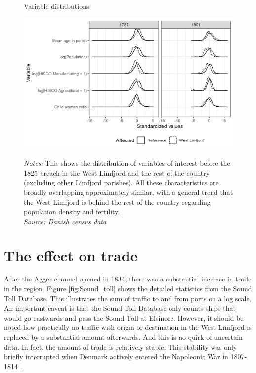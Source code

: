 \documentclass[11pt]{article}
\begin{document}
\begin{figure}
\begin{center}
  \caption{Variable distributions}
  \label{fig:bal}
  \includegraphics[width=1\textwidth]{Plots/Balancing_plot.png}
  \parbox{0.9\textwidth}{
  \caption*{\footnotesize \textit{Notes:} This shows the distribution of variables of interest before the 1825 breach in the West Limfjord and the rest of the country (excluding other Limfjord parishes). All these characteristics are broadly overlapping approximately similar, with a general trend that the West Limfjord is behind the rest of the country regarding population density and fertility. \\ \textit{Source: Danish census data}}
}
\end{center}
\end{figure}

\FloatBarrier
\section{The effect on trade}
After the Agger channel opened in 1834, there was a substantial increase in trade in the region. Figure \ref{fig:Sound_toll} shows the detailed statistics from the Sound Toll Database. This illustrates the sum of traffic to and from ports on a log scale. An important caveat is that the Sound Toll Database only counts ships that would go eastwards and pass the Sound Toll at Elsinore. However, it should be noted how practically no traffic with origin or destination in the West Limfjord is replaced by a substantial amount afterwards. And this is no quirk of uncertain data. In fact, the amount of trade is relatively stable. This stability was only briefly interrupted when Denmark actively entered the Napoleonic War in 1807-1814 \citep{Feldbaek2015}. 
\end{document}
